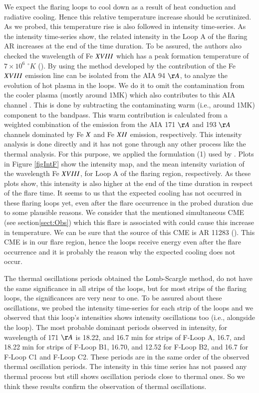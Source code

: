 \documentclass[oneside,onecolumn]{article}
\begin{document}
We expect the flaring loops to cool down as a result of heat conduction and radiative cooling. Hence this relative temperature increase should be scrutinized. 
As we probed, this temperature rise is also followed in intensity time-series. As the intensity time-series show, the related intensity in the Loop A of the flaring AR increases at the end of the time duration. To be assured, the authors also checked the wavelength of Fe   $\footnotesize{XVIII}$ which has a peak formation temperature of $7\times 10^{6}$ $^{\circ}K$ (\citet{ref:Ugarte2014}). 
By using the method developed by \citet{ref:Warren2012} the contribution of the Fe $\footnotesize{XVIII}$ emission line can be isolated from the AIA 94 $\AA$, to analyze the evolution of hot plasma in the loops. We do it to omit the contamination from the cooler plasma (mostly around 1MK) which also contributes to this AIA channel \citet{ref:Boerner2012}. 
This is done by subtracting the contaminating warm (i.e., around 1MK) component to the bandpass. This warm contribution is calculated from a weighted combination of the emission from the AIA 171 $\AA$ and 193 $\AA$ channels dominated by Fe $\footnotesize{X}$ and Fe $\footnotesize{XII}$ emission, respectively. 
This intensity analysis is done directly and it has not gone through any other process like the thermal analysis. For this purpose, we applied the formulation (1) used by \citet{ref:Li2015}. Plots in Figure \ref{figIntF} show the intensity map, and the mean intensity variation of the wavelength Fe $\footnotesize{XVIII}$, for Loop A of the flaring region, respectively. As these plots show, this intensity is also higher at the end of the time duration in respect of the flare time. 
It seems to us that the expected cooling has not occurred in these flaring loops yet, even after the flare occurrence in the probed duration due to some plausible reasons. 
We consider that the mentioned simultaneous CME (see section\ref{sect:Obs}) which this flare is associated with could cause this increase in temperature. We can be sure that the source of this CME is AR 11283 (\citet{ref:Romano2015}). This CME is in our flare region, hence the loops receive energy even after the flare occurrence and it is probably the reason why the expected cooling does not occur.

The thermal oscillations periods obtained the Lomb-Scargle method, do not have the same significance in all strips of the loops, but for most strips of the flaring loops, the significances are very near to one. To be assured about these oscillations, we probed the intensity time-series for each strip of the loops and we observed that this loop's intensities shows intensity oscillations too (i.e., alongside the loop). The most probable dominant periods observed in intensity, for wavelength of 171 $\AA$ is 18.22, and 16.7 min for strips of F-Loop A, 16.7, and 18.22 min for strips of F-Loop B1, 16.70, and 12.52 for F-Loop B2, and 16.7 for F-Loop C1 and F-Loop C2. These periods are in the same order of the observed thermal oscillation periods. The intensity in this time series has not passed any thermal process but still shows oscillation periods close to thermal ones. So we think these results confirm the observation of thermal oscillations.
\end{document}
